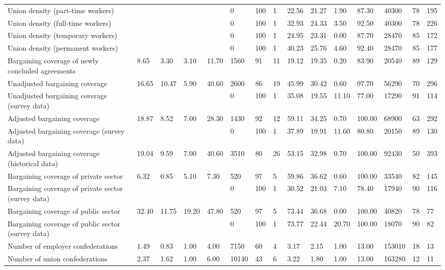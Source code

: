 \begin{longtable}{lllllllllllllll}
Union density (part-time workers) &  &  &  &  & 0 & 100 & 1 & 22.56 & 21.27 & 1.90 & 87.30 & 40300 & 78 & 195\\
Union density (full-time workers) &  &  &  &  & 0 & 100 & 1 & 32.93 & 24.33 & 3.50 & 92.50 & 40300 & 78 & 226\\
Union density (temporary workers) &  &  &  &  & 0 & 100 & 1 & 24.95 & 23.31 & 0.00 & 87.70 & 28470 & 85 & 172\\
Union density (permanent workers) &  &  &  &  & 0 & 100 & 1 & 40.23 & 25.76 & 4.60 & 92.40 & 28470 & 85 & 177\\
\addlinespace
Bargaining coverage of newly concluded agreements & 8.65 & 3.30 & 3.10 & 11.70 & 1560 & 91 & 11 & 19.12 & 19.35 & 0.20 & 83.90 & 20540 & 89 & 129\\
Unadjusted bargaining coverage & 16.65 & 10.47 & 5.90 & 40.60 & 2600 & 86 & 19 & 45.99 & 30.42 & 0.60 & 97.70 & 56290 & 70 & 296\\
Unadjusted bargaining coverage (survey data) &  &  &  &  & 0 & 100 & 1 & 35.08 & 19.55 & 11.10 & 77.00 & 17290 & 91 & 114\\
Adjusted bargaining coverage & 18.87 & 8.52 & 7.00 & 28.30 & 1430 & 92 & 12 & 59.11 & 34.25 & 0.70 & 100.00 & 68900 & 63 & 292\\
Adjusted bargaining coverage (survey data) &  &  &  &  & 0 & 100 & 1 & 37.89 & 19.91 & 11.60 & 80.80 & 20150 & 89 & 130\\
\addlinespace
Adjusted bargaining coverage (historical data) & 19.04 & 9.59 & 7.00 & 40.60 & 3510 & 80 & 26 & 53.15 & 32.98 & 0.70 & 100.00 & 92430 & 50 & 393\\
Bargaining coverage of private sector & 6.32 & 0.85 & 5.10 & 7.30 & 520 & 97 & 5 & 59.86 & 36.62 & 0.60 & 100.00 & 33540 & 82 & 145\\
Bargaining coverage of private sector (survey data) &  &  &  &  & 0 & 100 & 1 & 30.52 & 21.03 & 7.10 & 78.40 & 17940 & 90 & 116\\
Bargaining coverage of public sector & 32.40 & 11.75 & 19.20 & 47.80 & 520 & 97 & 5 & 73.44 & 36.68 & 0.00 & 100.00 & 40820 & 78 & 77\\
Bargaining coverage of public sector (survey data) &  &  &  &  & 0 & 100 & 1 & 73.77 & 22.44 & 20.70 & 100.00 & 18070 & 90 & 82\\
\addlinespace
Number of employer confederations & 1.49 & 0.83 & 1.00 & 4.00 & 7150 & 60 & 4 & 3.17 & 2.15 & 1.00 & 13.00 & 153010 & 18 & 13\\
Number of union confederations & 2.37 & 1.62 & 1.00 & 6.00 & 10140 & 43 & 6 & 3.22 & 1.80 & 1.00 & 13.00 & 163280 & 12 & 11\\

\end{longtable}

